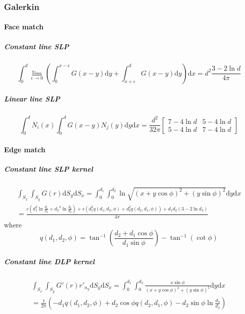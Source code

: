 \documentclass[a4paper,11pt]{article}
\newcommand{\td}{\mathrm{d}}
\begin{document}
\subsubsection{Galerkin}

\paragraph{Face match}

\subparagraph{Constant line SLP}

\begin{equation}
\int_{0}^{d}
\lim_{\epsilon \to 0}
\left(
\int_{0}^{x-\epsilon} G(x-y) \td y
+
\int_{x+\epsilon}^{d} G(x-y) \td y
\right)
\td x
=
d^2\frac{3-2\ln d}{4\pi}
\end{equation}

\subparagraph{Linear line SLP}

\begin{equation}
\int_{0}^{d} N_i(x) \int_{0}^{d} G(x-y) N_j(y) \td y \td x
=
\frac{d^2}{32\pi} \begin{bmatrix}
7-4 \ln d & 5 - 4 \ln d \\
5-4 \ln d & 7 - 4 \ln d
\end{bmatrix}
\end{equation}

\paragraph{Edge match}

\subparagraph{Constant line SLP kernel}

\begin{multline}
\int_{S_{x}} \int_{S_{y}} G(r) \td S_y \td S_x =
\int_{0}^{d_1} \int_{0}^{d_2}
\ln \sqrt{(x+y \cos\phi)^2 + (y\sin\phi)^2}
\td y \td x \\
=
\frac{
c \left(d_1^2 \ln \frac{d_1}{d_3} + {d_2}^2 \ln \frac{d_2}{d_3}\right)
+ s \left(d_1^2 q(d_1, d_2, \phi) + d_2^2 q(d_2, d_1, \phi)\right)
+ d_1 d_2 \left(3 - 2 \ln d_3 \right)
}{
4 \pi
}
\end{multline}
%
where
%
\begin{equation}
q(d_1, d_2, \phi) = \tan^{-1}\left(\frac{d_2 + d_1 \cos\phi}{d_1 \sin\phi}\right) - \tan^{-1}\left(\cot\phi\right)
\end{equation}

\subparagraph{Constant line DLP kernel}

\begin{multline}
\int_{S_{x}} \int_{S_{y}} G'(r) r'_{n_{y}} \td S_y \td S_x =
\int_{0}^{d_1} \int_{0}^{d_2}
\frac{x\sin\phi}{(x+y \cos\phi)^2 + (y\sin\phi)^2}
\td y \td x \\
=
\frac{1}{2\pi}\left(-d_1 q(d_1, d_2, \phi) + d_2 \cos\phi q(d_2, d_1, \phi)
- d_2 \sin\phi \ln \frac{d_3}{d_2}\right)
\end{multline}
\end{document}
